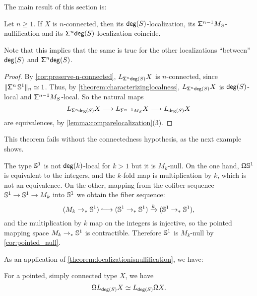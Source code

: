 The main result of this section is:

\begin{thm}\label{theorem:localizationisnullification}
    Let $n\geq 1$.
    If $X$ is $n$-connected, then its
    $\degg(S)$-localization, its $\suspsym^{n-1} M_S$-nullification and
    its $\suspsym^n \degg(S)$-localization coincide.
\end{thm}

Note that this implies that the same is true for the other localizations ``between''
$\degg(S)$ and $\suspsym^n \degg(S)$.

\begin{proof}
By \cref{cor:preserve-n-connected},
$L_{\susp[n] \degg(S)} X$ is $n$-connected,
since $\trunc{n}{\suspsym^n \, \sphere{1}} \eqvsym 1$.
Thus, by \cref{theorem:characterizinglocalness}, $L_{\susp[n] \degg(S)} X$
is $\degg(S)$-local and $\suspsym^{n-1} M_S$-local.
So the natural maps
\[
  L_{\susp[n] \degg(S)} X \lra L_{\suspsym^{n-1} M_S} X \lra L_{\degg(S)} X
\]
are equivalences, by \cref{lemma:comparelocalization}(3).
\end{proof}

This theorem fails without the connectedness hypothesis, as the next example shows.

\begin{eg}
    The type $\sphere{1}$ is not $\degg(k)$-local for $k > 1$ but it is $M_k$-null.
    On the one hand, $\loopspacesym \sphere{1}$ is equivalent to the integers, and the $k$-fold map
    is multiplication by $k$, which is not an equivalence.
    On the other, mapping from the cofiber sequence $\sphere{1}\to \sphere{1} \to M_k$ into $\sphere{1}$ we
    obtain the fiber sequence:
    \[
        (M_k \to_\ast \sphere{1}) \longhookrightarrow (\sphere{1} \to_\ast \sphere{1}) \xrightarrow{k} (\sphere{1}\to_\ast \sphere{1}),
    \]
    and the multiplication by $k$ map on the integers is injective, so the pointed mapping space $M_k \to_\ast \sphere{1}$ is contractible. Therefore $\sphere{1}$ is $M_k$-null by \cref{cor:pointed_null}.
\end{eg}

As an application of \cref{theorem:localizationisnullification}, we have:

\begin{cor}\label{corollary:commutativitylooplocalizationsimpconn}
    For a pointed, simply connected type $X$, we have
    \[
        \loopspacesym L_{\degg(S)} X \simeq L_{\degg(S)} \loopspacesym X.
    \]
\end{cor}

